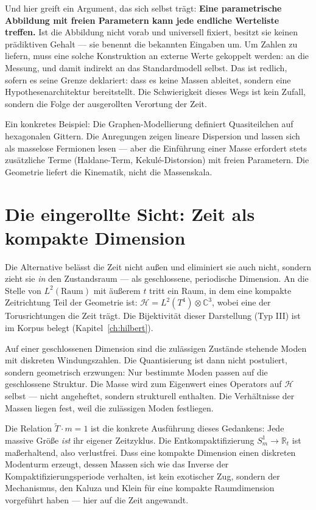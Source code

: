 Und hier greift ein Argument, das sich selbst trägt: \textbf{Eine
parametrische Abbildung mit freien Parametern kann jede endliche
Werteliste treffen.} Ist die Abbildung nicht vorab und universell
fixiert, besitzt sie keinen prädiktiven Gehalt --- sie benennt die
bekannten Eingaben um. Um Zahlen zu liefern, muss eine solche
Konstruktion an externe Werte gekoppelt werden: an die Messung, und
damit indirekt an das Standardmodell selbst. Das ist redlich, sofern es
seine Grenze deklariert: dass es keine Massen ableitet, sondern eine
Hypothesenarchitektur bereitstellt. Die Schwierigkeit dieses Wegs ist
kein Zufall, sondern die Folge der ausgerollten Verortung der Zeit.

Ein konkretes Beispiel: Die Graphen-Modellierung definiert
Quasiteilchen auf hexagonalen Gittern. Die Anregungen zeigen lineare
Dispersion und lassen sich als masselose Fermionen lesen --- aber die
Einführung einer Masse erfordert stets zusätzliche Terme (Haldane-Term,
Kekulé-Distorsion) mit freien Parametern. Die Geometrie liefert die
Kinematik, nicht die Massenskala.

\section{Die eingerollte Sicht: Zeit als kompakte Dimension}

Die Alternative belässt die Zeit nicht außen und eliminiert sie auch
nicht, sondern zieht sie \emph{in} den Zustandsraum --- als geschlossene,
periodische Dimension. An die Stelle von $L^2(\text{Raum})$ mit äußerem
$t$ tritt ein Raum, in dem eine kompakte Zeitrichtung Teil der Geometrie
ist: $\mathcal{H} = L^2(T^4)\otimes\mathbb{C}^3$, wobei eine der
Torusrichtungen die Zeit trägt. Die Bijektivität dieser Darstellung
(Typ III) ist im Korpus belegt (Kapitel~\ref{ch:hilbert}).

Auf einer geschlossenen Dimension sind die zulässigen Zustände stehende
Moden mit diskreten Windungszahlen. Die Quantisierung ist dann nicht
postuliert, sondern geometrisch erzwungen: Nur bestimmte Moden passen
auf die geschlossene Struktur. Die Masse wird zum Eigenwert eines
Operators auf $\mathcal{H}$ selbst --- nicht angeheftet, sondern
strukturell enthalten. Die Verhältnisse der Massen liegen fest, weil die
zulässigen Moden festliegen.

Die Relation $\tilde T\cdot m = 1$ ist die konkrete Ausführung dieses
Gedankens: Jede massive Größe \emph{ist} ihr eigener Zeitzyklus. Die
Entkompaktifizierung $S^1_m\to\mathbb{R}_t$ ist maßerhaltend, also
verlustfrei. Dass eine kompakte Dimension einen diskreten Modenturm
erzeugt, dessen Massen sich wie das Inverse der Kompaktifizierungsperiode
verhalten, ist kein exotischer Zug, sondern der Mechanismus, den Kaluza
und Klein für eine kompakte Raumdimension vorgeführt haben --- hier auf
die Zeit angewandt.

